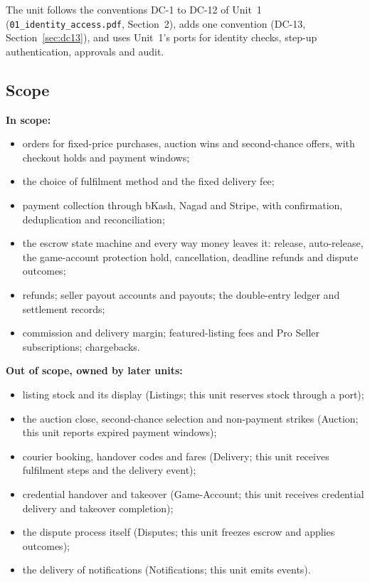 \documentclass[11pt,a4paper]{article}
\begin{document}
The unit follows the conventions DC-1 to DC-12 of Unit~1 (\texttt{01\_identity\_access.pdf}, Section~2), adds one convention (DC-13, Section~\ref{sec:dc13}), and uses Unit~1's ports for identity checks, step-up authentication, approvals and audit.

\subsection{Scope}
\textbf{In scope:}
\begin{itemize}[nosep]
  \item orders for fixed-price purchases, auction wins and second-chance offers, with checkout holds and payment windows;
  \item the choice of fulfilment method and the fixed delivery fee;
  \item payment collection through bKash, Nagad and Stripe, with confirmation, deduplication and reconciliation;
  \item the escrow state machine and every way money leaves it: release, auto-release, the game-account protection hold, cancellation, deadline refunds and dispute outcomes;
  \item refunds; seller payout accounts and payouts; the double-entry ledger and settlement records;
  \item commission and delivery margin; featured-listing fees and Pro Seller subscriptions; chargebacks.
\end{itemize}

\textbf{Out of scope, owned by later units:}
\begin{itemize}[nosep]
  \item listing stock and its display (Listings; this unit reserves stock through a port);
  \item the auction close, second-chance selection and non-payment strikes (Auction; this unit reports expired payment windows);
  \item courier booking, handover codes and fares (Delivery; this unit receives fulfilment steps and the delivery event);
  \item credential handover and takeover (Game-Account; this unit receives credential delivery and takeover completion);
  \item the dispute process itself (Disputes; this unit freezes escrow and applies outcomes);
  \item the delivery of notifications (Notifications; this unit emits events).
\end{itemize}
\end{document}
